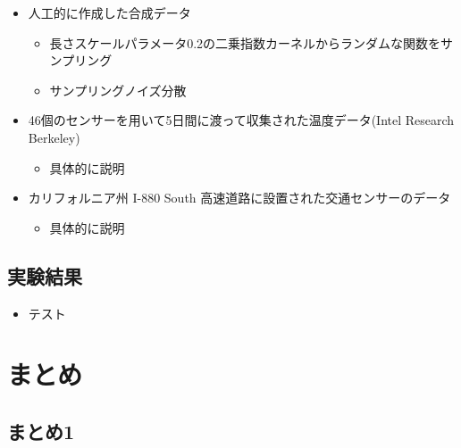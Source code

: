 \documentclass[dvipdfmx, 10.5pt]{beamer}
\begin{document}
\begin{frame}{\insertsubsection}
	\begin{itemize}
		\item 人工的に作成した合成データ
		\begin{itemize}
			\item 長さスケールパラメータ0.2の二乗指数カーネルからランダムな関数をサンプリング
			\item サンプリングノイズ分散
		\end{itemize}
		\item 46個のセンサーを用いて5日間に渡って収集された温度データ(Intel Research Berkeley)
		\begin{itemize}
			\item 具体的に説明
		\end{itemize}
		\item カリフォルニア州 I-880 South 高速道路に設置された交通センサーのデータ
		\begin{itemize}
			\item 具体的に説明
		\end{itemize}
	\end{itemize}

\end{frame}


\subsection{実験結果}
\begin{frame}{\insertsubsection}
	\begin{itemize}
		\item テスト
	\end{itemize}

\end{frame}

\section{まとめ}


\subsection{まとめ1}
\end{document}
